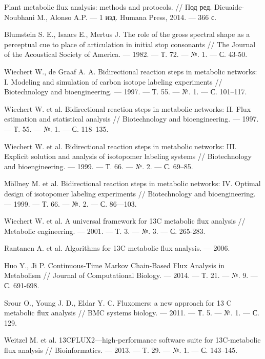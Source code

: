 \documentclass[14pt, a4paper]{extreport}
\begin{document}
\begin{thebibliography}{XXXX}
	Plant metabolic flux analysis: methods and protocols. // Под ред. Dieuaide-Noubhani M., Alonso A.P. --- 1 изд. Humana Press, 2014. --- 366 с.
	
	Blumstein S. E., Isaacs E., Mertus J. The role of the gross spectral shape as a perceptual cue to place of articulation in initial stop consonants // The Journal of the Acoustical Society of America. --- 1982. --- Т. 72. --- №. 1. --- С. 43-50.
	
	Wiechert W., de Graaf A. A. Bidirectional reaction steps in metabolic networks: I. Modeling and simulation of carbon isotope labeling experiments // Biotechnology and bioengineering. --- 1997. --- Т. 55. --- №. 1. --- С. 101--117.
	
	Wiechert W. et al. Bidirectional reaction steps in metabolic networks: II. Flux estimation and statistical analysis // Biotechnology and bioengineering. --- 1997. --- Т. 55. --- №. 1. --- С. 118--135.
	
	Wiechert W. et al. Bidirectional reaction steps in metabolic networks: III. Explicit solution and analysis of isotopomer labeling systems // Biotechnology and bioengineering. --- 1999. --- Т. 66. --- №. 2. --- С. 69--85.
	
	Möllney M. et al. Bidirectional reaction steps in metabolic networks: IV. Optimal design of isotopomer labeling experiments // Biotechnology and bioengineering. --- 1999. --- Т. 66. --- №. 2. --- С. 86---103.
	
	Wiechert W. et al. A universal framework for 13C metabolic flux analysis // Metabolic engineering. --- 2001. --- Т. 3. --- №. 3. --- С. 265-283.
	
	Rantanen A. et al. Algorithms for 13C metabolic flux analysis. --- 2006.
	
	Huo Y., Ji P. Continuous-Time Markov Chain-Based Flux Analysis in Metabolism // Journal of Computational Biology. --- 2014. --- Т. 21. --- №. 9. --- С. 691-698.
	
	Srour O., Young J. D., Eldar Y. C. Fluxomers: a new approach for 13 C metabolic flux analysis // BMC systems biology. --- 2011. --- Т. 5. --- №. 1. --- С. 129.
		
	Weitzel M. et al. 13CFLUX2—high-performance software suite for 13C-metabolic flux analysis // Bioinformatics. --- 2013. --- Т. 29. --- №. 1. --- С. 143--145.
	

\end{thebibliography}
\end{document}
